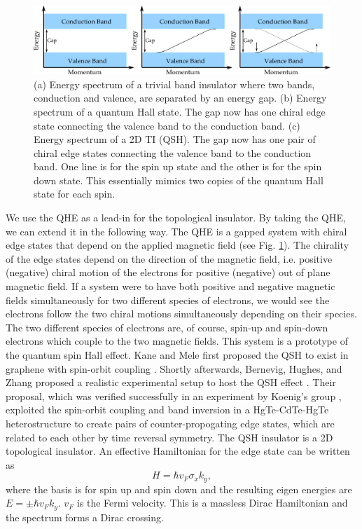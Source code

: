 \begin{figure}
\center
\includegraphics[width=\textwidth]{include/bands2.png}
\caption{(a) Energy spectrum of a trivial band insulator where two bands, conduction and valence, are separated by an energy gap. 
(b)  Energy spectrum of a quantum Hall state. The gap now has one chiral edge state connecting the valence band to the conduction band.  
(c)  Energy spectrum of a 2D TI (QSH). The gap now has one pair of chiral edge states connecting the valence band to the conduction band.  One line is for the spin up state and the other is for the spin down state. This essentially mimics two copies of the quantum Hall state for each spin.
}\label{insulators}
\end{figure}

We use the QHE as a lead-in for the topological insulator. 
By taking the QHE, we can extend it in the following way. The QHE is a gapped system with chiral edge states that depend on the applied magnetic field (see Fig. \ref{insulators}). The chirality of the edge states depend on the direction of the magnetic field, i.e. positive (negative) chiral motion of the electrons for positive (negative) out of plane magnetic field. If a system were to have both positive and negative magnetic fields simultaneously for two different species of electrons, we would see the electrons follow the two chiral motions simultaneously depending on their species. The two different species of electrons are, of course, spin-up and spin-down electrons which couple to the two magnetic fields. This system is a prototype of the quantum spin Hall effect. Kane and Mele first proposed the QSH to exist in graphene with spin-orbit coupling \cite{kane_quantum_2005}. Shortly afterwards, Bernevig, Hughes, and Zhang proposed a realistic experimental setup to host the QSH effect \cite{bernevig_quantum_2006}. Their proposal, which was verified successfully in an experiment by Koenig's group \cite{konig_quantum_2007}, exploited the spin-orbit coupling and band inversion in a HgTe-CdTe-HgTe heterostructure to create pairs of counter-propogating edge states, which are related to each other by time reversal symmetry. The QSH insulator is a 2D topological insulator. An effective Hamiltonian for the edge state can be written as 
\begin{equation}
H=\hbar v_F \sigma_x k_y,
\end{equation}
where the basis is for spin up and spin down and the resulting eigen energies are $E=\pm \hbar v_F k_y$. $v_F$ is the Fermi velocity. This is a massless Dirac Hamiltonian and the spectrum forms a Dirac crossing. 
 
